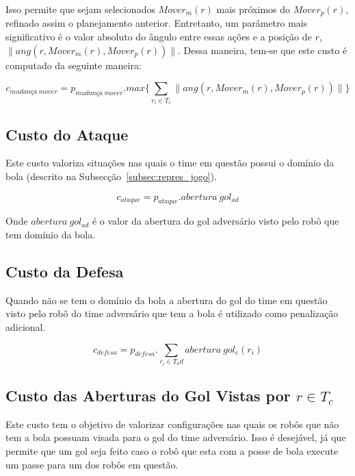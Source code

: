 Isso permite que sejam selecionados $Mover_{m}(r)$ mais próximos do
$Mover_p(r)$, refinado assim o planejamento anterior. Entretanto, um parâmetro
mais significativo é o valor absoluto do ângulo entre essas ações e a posição de
$r$, $\lVert ang(r, Mover_{m}(r), Mover_p(r)) \rVert$.  Dessa maneira, tem-se
que este custo é computado da seguinte maneira:

\begin{dmath}
 c_{mudança{\ }mover} = p_{mudança{\ }mover} .
 max \lbrace \sum_{r_i \in T_c} \lVert ang(r, Mover_{m}(r), Mover_p(r)) \rVert \rbrace
\end{dmath}

\subsection{Custo do Ataque}

Este custo valoriza situações nas quais o time em questão possui o domínio da
bola (descrito na Subsecção~\ref{subsec:repres_jogo}).

\begin{dmath}
 c_{ataque} = p_{ataque} . abertura{\ }gol_{ad}
\end{dmath}

Onde $abertura{\ }gol_{ad}$ é o valor da abertura do gol adversário visto pelo
robô que tem domínio da bola.

\subsection{Custo da Defesa}

Quando não se tem o domínio da bola a abertura do gol do time em questão visto
pelo robô do time adversário que tem a bola é utilizado como penalização
adicional.

\begin{dmath}
  c_{defesa} = p_{defesa} .
   \sum_{r_i \in T_ad} abertura{\ }gol_c(r_i)
\end{dmath}

\subsection{Custo das Aberturas do Gol Vistas por $r\in T_c$}

Este custo tem o objetivo de valorizar configurações nas quais os robôs que não
tem a bola possuam visada para o gol do time adversário.  Isso é desejável, já
que permite que um gol seja feito caso o robô que esta com a posse de bola
execute um passe para um dos robôs em questão.

